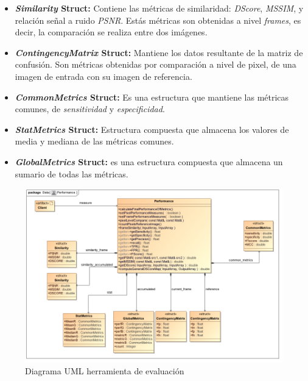 \begin{itemize}
\item \textbf{\textit{Similarity} Struct:} Contiene las métricas de similaridad: \textit{DScore}, \textit{MSSIM}, y relación señal a ruido \textit{PSNR}. Estás métricas son obtenidas a nivel \textit{frames}, es decir, la comparación se realiza entre dos imágenes.
\item \textbf{\textit{ContingencyMatrix} Struct:} Mantiene los datos resultante de la matriz de confusión. Son métricas obtenidas por comparación a nivel de pixel, de una imagen de entrada con su imagen de referencia.
\item \textbf{\textit{CommonMetrics} Struct:} Es una estructura que mantiene las métricas comunes, de \textit{sensitividad} y \textit{especificidad}. 
\item \textbf{\textit{StatMetrics} Struct:} Estructura compuesta que almacena los valores de media y mediana de las métricas comunes.
\item \textbf{\textit{GlobalMetrics} Struct:} es una estructura compuesta que almacena un sumario de todas las métricas.
\end{itemize}


\begin{figure}[h!]
\centering
\includegraphics[scale=0.5]{img/ch5/Performance}
\caption[Diagrama UML herramienta de evaluación]{Diagrama UML herramienta de evaluación}
\label{fig:uml_evaluacion}
\end{figure}


